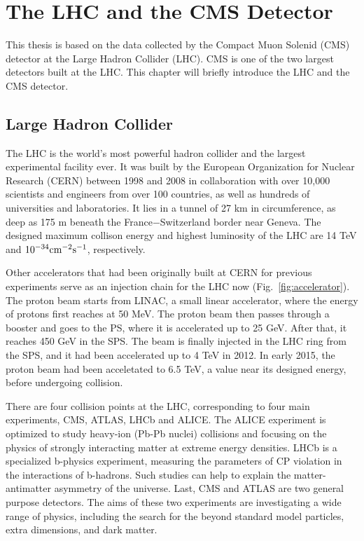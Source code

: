 \chapter{The LHC and the CMS Detector}
This thesis is based on the data collected by the Compact Muon Solenid (CMS) detector at the Large Hadron Collider (LHC). CMS is one of the two largest detectors built at the LHC. This chapter will briefly introduce the LHC and the CMS detector.

\section{Large Hadron Collider}
The LHC is the world's most powerful hadron collider and the largest experimental facility ever. It was built by the European Organization for Nuclear Research (CERN) between 1998 and 2008 in collaboration with over 10,000 scientists and engineers from over 100 countries, as well as hundreds of universities and laboratories. It lies in a tunnel of 27 km in circumference, as deep as 175 m beneath the France$-$Switzerland border near Geneva. The designed maximum collison energy and highest luminosity of the LHC are 14 TeV and $\textup{10}^{-34} \textup{cm}^{-2}\textup{s}^{-1}$, respectively.

Other accelerators that had been originally built at CERN for previous experiments serve as an injection chain for the LHC now (Fig.~\ref{fig:accelerator}). The proton beam starts from LINAC, a small linear accelerator, where the energy of protons first reaches at 50 MeV. The proton beam then passes through a booster and goes to the PS, where it is accelerated up to 25 GeV. After that, it reaches 450 GeV in the SPS. The beam is finally injected in the LHC ring from the SPS, and it had been accelerated up to 4 TeV in 2012. In early 2015, the proton beam had been acceletated to 6.5 TeV, a value near its designed energy, before undergoing collision.

There are four collision points at the LHC, corresponding to four main experiments, CMS, ATLAS, LHCb and ALICE. The ALICE experiment is optimized to study heavy-ion (Pb-Pb nuclei) collisions and focusing on the physics of strongly interacting matter at extreme energy densities. LHCb is a specialized b-physics experiment, measuring the parameters of CP violation in the interactions of b-hadrons. Such studies can help to explain the matter-antimatter asymmetry of the universe. Last, CMS and ATLAS are two general purpose detectors. The aims of these two experiments are investigating a wide range of physics, including the search for the beyond standard model particles, extra dimensions, and dark matter.


